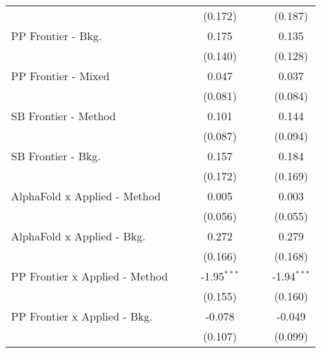 \begin{tabular}{lcccccc}
                                  &                &         & (0.172)       &                &         & (0.187)\\   
   PP Frontier - Bkg.             &                &         & 0.175         &                &         & 0.135\\   
                                  &                &         & (0.140)       &                &         & (0.128)\\   
   PP Frontier - Mixed            &                &         & 0.047         &                &         & 0.037\\   
                                  &                &         & (0.081)       &                &         & (0.084)\\   
   SB Frontier - Method           &                &         & 0.101         &                &         & 0.144\\   
                                  &                &         & (0.087)       &                &         & (0.094)\\   
   SB Frontier - Bkg.             &                &         & 0.157         &                &         & 0.184\\   
                                  &                &         & (0.172)       &                &         & (0.169)\\   
   AlphaFold x Applied - Method   &                &         & 0.005         &                &         & 0.003\\   
                                  &                &         & (0.056)       &                &         & (0.055)\\   
   AlphaFold x Applied - Bkg.     &                &         & 0.272         &                &         & 0.279\\   
                                  &                &         & (0.166)       &                &         & (0.168)\\   
   PP Frontier x Applied - Method &                &         & -1.95$^{***}$ &                &         & -1.94$^{***}$\\   
                                  &                &         & (0.155)       &                &         & (0.160)\\   
   PP Frontier x Applied - Bkg.   &                &         & -0.078        &                &         & -0.049\\   
                                  &                &         & (0.107)       &                &         & (0.099)\\   

\end{tabular}
